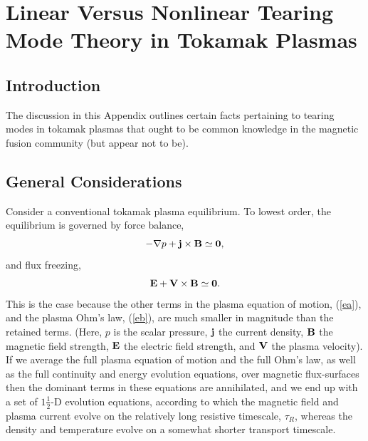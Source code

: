 \documentclass[12pt,prb,aps]{revtex4-1}
\begin{document}
\appendix
\section{Linear Versus Nonlinear Tearing Mode Theory in Tokamak Plasmas}\label{appa}
\subsection{Introduction}
The discussion in this Appendix outlines certain facts pertaining
to tearing modes in tokamak plasmas that ought to be common knowledge in the 
magnetic fusion community (but appear not to be). 

\subsection{General Considerations}\label{general}
Consider a conventional tokamak plasma equilibrium. To lowest order, the equilibrium is governed by force balance,
\begin{equation}\label{ea}
-\nabla p + {\bf j}\times {\bf B} \simeq {\bf 0},
\end{equation}
and
flux freezing,
\begin{equation}\label{eb}
{\bf E} + {\bf V}\times {\bf B} \simeq {\bf 0}.
\end{equation}
This is the case because the other terms in the plasma equation of motion,
(\ref{ea}), and the plasma Ohm's law, (\ref{eb}), are much
smaller in magnitude than the retained terms. (Here, $p$ is the
scalar pressure, ${\bf j}$ the current density, ${\bf B}$ the
magnetic field strength, ${\bf E}$ the electric field strength, and ${\bf V}$ the plasma velocity). If we average the full plasma equation of motion and the full Ohm's law, as well as the full continuity and energy evolution equations, over magnetic flux-surfaces
then the dominant terms in these equations are annihilated, and
we end up with a set of $1\tfrac{1}{2}$-D evolution equations,
according to which the magnetic field and plasma current
evolve on the relatively long resistive timescale, $\tau_R$,
whereas the density and temperature evolve on a somewhat
shorter transport timescale.\cite{transp,gim}
\end{document}
